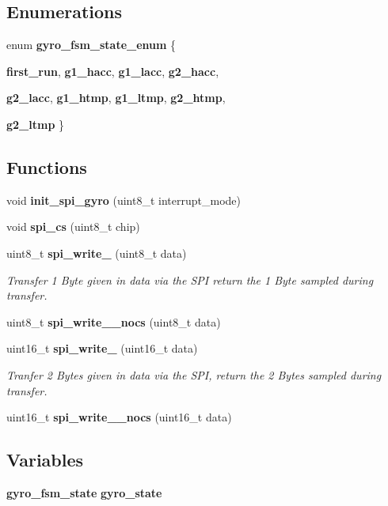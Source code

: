 \subsection*{Enumerations}
\begin{CompactItemize}
\item 
enum {\bf gyro\_\-fsm\_\-state\_\-enum} \{ \par
{\bf first\_\-run}, 
{\bf g1\_\-hacc}, 
{\bf g1\_\-lacc}, 
{\bf g2\_\-hacc}, 
\par
{\bf g2\_\-lacc}, 
{\bf g1\_\-htmp}, 
{\bf g1\_\-ltmp}, 
{\bf g2\_\-htmp}, 
\par
{\bf g2\_\-ltmp}
 \}
\end{CompactItemize}
\subsection*{Functions}
\begin{CompactItemize}
\item 
void {\bf init\_\-spi\_\-gyro} (uint8\_\-t interrupt\_\-mode)
\item 
void {\bf spi\_\-cs} (uint8\_\-t chip)
\item 
uint8\_\-t {\bf spi\_\-write\_} (uint8\_\-t data)
\begin{CompactList}\small\item\em Transfer 1 Byte given in data via the SPI return the 1 Byte sampled during transfer. \item\end{CompactList}\item 
uint8\_\-t {\bf spi\_\-write\_\_\-nocs} (uint8\_\-t data)
\item 
uint16\_\-t {\bf spi\_\-write\_} (uint16\_\-t data)
\begin{CompactList}\small\item\em Tranfer 2 Bytes given in data via the SPI, return the 2 Bytes sampled during transfer. \item\end{CompactList}\item 
uint16\_\-t {\bf spi\_\-write\_\_\-nocs} (uint16\_\-t data)
\end{CompactItemize}
\subsection*{Variables}
\begin{CompactItemize}
\item 
{\bf gyro\_\-fsm\_\-state} {\bf gyro\_\-state}
\end{CompactItemize}
